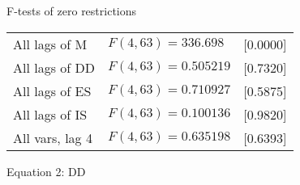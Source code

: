 \documentclass[11pt]{article}
\begin{document}
\begin{center}
F-tests of zero restrictions\\[1em]
\begin{tabular}{lll}
All lags of M & $F(4, 63) = 336.698$ & [0.0000]\\
All lags of DD & $F(4, 63) = 0.505219$ & [0.7320]\\
All lags of ES & $F(4, 63) = 0.710927$ & [0.5875]\\
All lags of IS & $F(4, 63) = 0.100136$ & [0.9820]\\
All vars, lag 4 & $F(4, 63) = 0.635198$ & [0.6393]\\
\end{tabular}
\end{center}

\clearpage

\begin{center}

Equation 2: DD\\

\vspace{1em}


\end{center}
\end{document}
